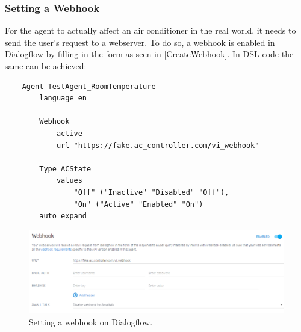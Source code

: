 \subsubsection{Setting a Webhook}
For the agent to actually affect an air conditioner in the real world, it needs to send the user's request to a webserver. To do so, a webhook is enabled in Dialogflow by filling in the form as seen in \autoref{CreateWebhook}.
In DSL code the same can be achieved:
\begin{samepage}
    \begin{verbatim}
    Agent TestAgent_RoomTemperature
        language en 
            
        Webhook 
            active 
            url "https://fake.ac_controller.com/vi_webhook"

        Type ACState
            values 
                "Off" ("Inactive" "Disabled" "Off"),
                "On" ("Active" "Enabled" "On")
        auto_expand
    \end{verbatim}
\end{samepage}

\begin{figure}[ht]
    \centering
    \includegraphics[width=1\textwidth]{Thesis_Images/CreateWebhook.PNG}
    \caption{Setting a webhook on Dialogflow.}
        \label{CreateWebhook}
\end{figure}

